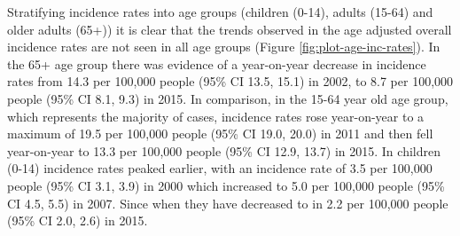 \documentclass[11pt,twoside]{bristolthesis}
\begin{document}
  Stratifying incidence rates into age groups (children (0-14), adults (15-64) and older adults (65+)) it is clear that the trends observed in the age adjusted overall incidence rates are not seen in all age groups (Figure \ref{fig:plot-age-inc-rates}). In the 65+ age group there was evidence of a year-on-year decrease in incidence rates from 14.3 per 100,000 people (95\% CI 13.5, 15.1) in 2002, to 8.7 per 100,000 people (95\% CI 8.1, 9.3) in 2015. In comparison, in the 15-64 year old age group, which represents the majority of cases, incidence rates rose year-on-year to a maximum of 19.5 per 100,000 people (95\% CI 19.0, 20.0) in 2011 and then fell year-on-year to 13.3 per 100,000 people (95\% CI 12.9, 13.7) in 2015. In children (0-14) incidence rates peaked earlier, with an incidence rate of 3.5 per 100,000 people (95\% CI 3.1, 3.9) in 2000 which increased to 5.0 per 100,000 people (95\% CI 4.5, 5.5) in 2007. Since when they have decreased to in 2.2 per 100,000 people (95\% CI 2.0, 2.6) in 2015.
\end{document}
